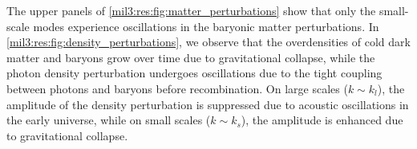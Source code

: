 














The upper panels of \cref{mil3:res:fig:matter_perturbations} show that only the small-scale modes experience oscillations in the baryonic matter perturbations. In \cref{mil3:res:fig:density_perturbations}, we observe that the overdensities of cold dark matter and baryons grow over time due to gravitational collapse, while the photon density perturbation undergoes oscillations due to the tight coupling between photons and baryons before recombination. On large scales ($k \sim k_l$), the amplitude of the density perturbation is suppressed due to acoustic oscillations in the early universe, while on small scales ($k \sim k_s$), the amplitude is enhanced due to gravitational collapse.

